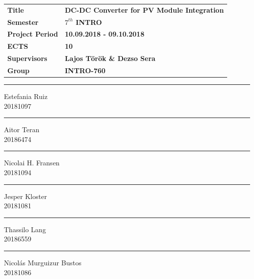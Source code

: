 \vspace*{1cm}
\begin{table}[H]
	\begin{tabular}{l l} 
		\textbf{Title} &  \textbf{DC-DC Converter for PV Module Integration} \\ 
		\textbf{Semester} & \textbf{$7^{th}$ INTRO}  \\ 
		\textbf{Project Period} & \textbf{10.09.2018 - 09.10.2018}  \\ 
		\textbf{ECTS} &  \textbf{10}\\ 
		\textbf{Supervisors} & \textbf{Lajos Török \& Dezso Sera}  \\ 
		\textbf{Group} & \textbf{INTRO-760}  \\ 
	\end{tabular}
\end{table}

\vspace*{2cm}
\begin{center}	
	\vspace{40pt}
	\begin{minipage}{0.4\linewidth}
		\centering
		\hrule
		\vspace{12pt}
		Estefania Ruiz\\ 
		20181097
	\end{minipage}
	\hspace{10pt}
	\vspace{40pt}
	\begin{minipage}{0.4\linewidth}
		\centering
		\hrule
		\vspace{12pt}
		Aitor Teran\\ 
		20186474	
	\end{minipage}
	\hspace{10pt}
	\vspace{40pt}
	\begin{minipage}{0.4\linewidth}
		\centering
		\hrule
		\vspace{12pt}
		Nicolai H. Fransen\\
		20181094
	\end{minipage}
	\hspace{10pt}
	\begin{minipage}{0.4\linewidth}
		\centering
		\hrule
		\vspace{12pt}
		Jesper Kloster\\
		20181081 
	\end{minipage}
	\hspace{10pt}
	\begin{minipage}{0.4\linewidth}
		\centering
		\hrule
		\vspace{12pt}
		Thassilo Lang\\ 
		20186559 
	\end{minipage}
	\hspace{10pt}
	\vspace{20pt}
	\begin{minipage}{0.4\linewidth}
		\centering
		\hrule
		\vspace{12pt}
		Nicolás Murguizur Bustos\\ 
		20181086
	\end{minipage}
\end{center}

